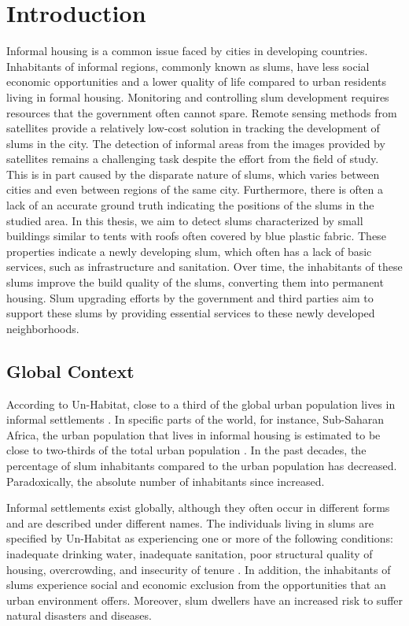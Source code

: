 \section{Introduction}

Informal housing is a common issue faced by cities in developing countries. Inhabitants of informal regions, commonly known as slums, have less social economic opportunities and a lower quality of life compared to urban residents living in formal housing. Monitoring and controlling slum development requires resources that the government often cannot spare. Remote sensing methods from satellites provide a relatively low-cost solution in tracking the development of slums in the city. The detection of informal areas from the images provided by satellites remains a challenging task despite the effort from the field of study. This is in part caused by the disparate nature of slums, which varies between cities and even between regions of the same city. Furthermore, there is often a lack of an accurate ground truth indicating the positions of the slums in the studied area. In this thesis, we aim to detect slums characterized by small buildings similar to tents with roofs often covered by blue plastic fabric. These properties indicate a newly developing slum, which often has a lack of basic services, such as infrastructure and sanitation. Over time, the inhabitants of these slums improve the build quality of the slums, converting them into permanent housing. Slum upgrading efforts by the government and third parties aim to support these slums by providing essential services to these newly developed neighborhoods.


\subsection{Global Context}
According to Un-Habitat, close to a third of the global urban population lives in informal settlements \cite{2016state}. In specific parts of the world, for instance, Sub-Saharan Africa, the urban population that lives in informal housing is estimated to be close to two-thirds of the total urban population \cite{un2013planning}. In the past decades, the percentage of slum inhabitants compared to the urban population has decreased. Paradoxically, the absolute number of inhabitants since increased\cite{2016state}.

Informal settlements exist globally, although they often occur in different forms and are described under different names. The individuals living in slums are specified by Un-Habitat as experiencing one or more of the following conditions: inadequate drinking water, inadequate sanitation, poor  structural quality of housing, overcrowding, and insecurity of tenure \cite{un2015slum}. In addition, the inhabitants of slums experience social and economic exclusion from the opportunities that an urban environment offers. Moreover, slum dwellers have an increased risk to suffer natural disasters and diseases. 

